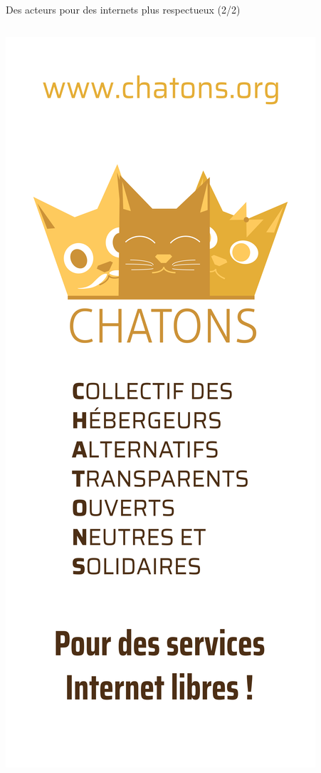 \begin{frame}{Des acteurs pour des internets plus respectueux (2/2)}
\begin{columns}
\begin{column}{0.5\textwidth}
\begin{center}
      \includegraphics[height=0.8\textheight]{un_autre_internet/chatons.png}
    \end{center}
    \end{column}
  \end{columns}
\end{frame}

